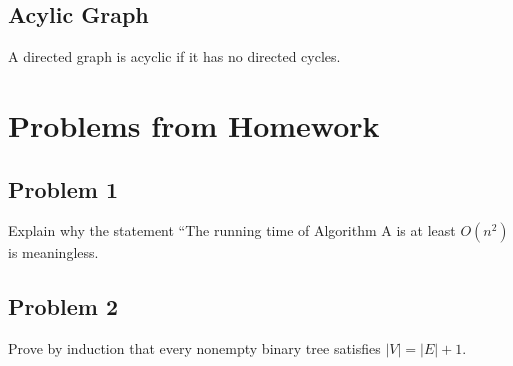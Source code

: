 \documentclass[a4paper,12pt]{article}
\begin{document}
\subsection{Acylic Graph}

A directed graph is acyclic if it has no directed cycles.

\section{Problems from Homework}

\subsection*{Problem 1}

Explain why the statement “The running time of Algorithm A is at least $O(n^2)$ is meaningless.

\subsection*{Problem 2}

Prove by induction that every nonempty binary tree satisfies $|V| = |E| + 1$.
\end{document}
